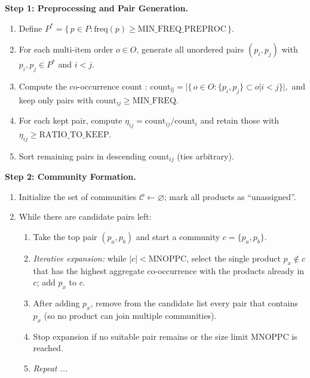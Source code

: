 \documentclass[preprint,review,11pt,authoryear]{elsarticle}
\begin{document}
\begin{algorithm}[H]
\caption{Algorithm 1: Greedy Product Clustering and Station Assignment (CSLAP)}
\label{alg:greedy-cslap}
\begin{algorithmic}[1]

\Statex \textbf{Step 1: Preprocessing and Pair Generation.}
\begin{enumerate}[label=(\alph*)]
\item Define $P^*=\{\,p\in P:\mathrm{freq}(p)\ge \mathrm{MIN\_FREQ\_PREPROC}\,\}$.
\item For each multi-item order $o\in O$, generate all unordered pairs $(p_i,p_j)$ with $p_i,p_j\in P^*$ and $i<j$.
\item Compute the co-occurrence count : \(\mathrm{count_{ij}} = \big|\{\,o \in O : \{p_i,p_j\} \subset o | i < j \}\big|, \)
and keep only pairs with $\mathrm{count}_{ij}\ge \mathrm{MIN\_FREQ}$.
\item For each kept pair, compute $\eta_{ij}=\mathrm{count}_{ij}/\mathrm{count}_i$ and retain those with $\eta_{ij}\ge \mathrm{RATIO\_TO\_KEEP}$.
\item Sort remaining pairs in descending $\mathrm{count}_{ij}$ (ties arbitrary).
\end{enumerate}
\medskip
\textbf{Step 2: Community Formation.}
\begin{enumerate}[label=(\alph*)]
\item Initialize the set of communities $\mathcal{C}\leftarrow\varnothing$; mark all products as “unassigned”.
\item While there are candidate pairs left:
  \begin{enumerate}[label*=\arabic*.]
  \item Take the top pair $(p_a,p_b)$ and start a community $c=\{p_a,p_b\}$.
  \item \emph{Iterative expansion:} while $|c|<\mathrm{MNOPPC}$, select the single product \(p_x\notin c\) that has the highest aggregate co-occurrence with the products already in \(c\); add  \(p_x\) to \(c\).
  \item After adding $p_x$, remove from the candidate list every pair that contains $p_x$ (so no product can join multiple communities).
  \item Stop expansion if no suitable pair remains or the size limit $\mathrm{MNOPPC}$ is reached.
  \item \textit{Repeat ...}
  \end{enumerate}
\end{enumerate}
\end{algorithmic}
\end{algorithm}
\end{document}
